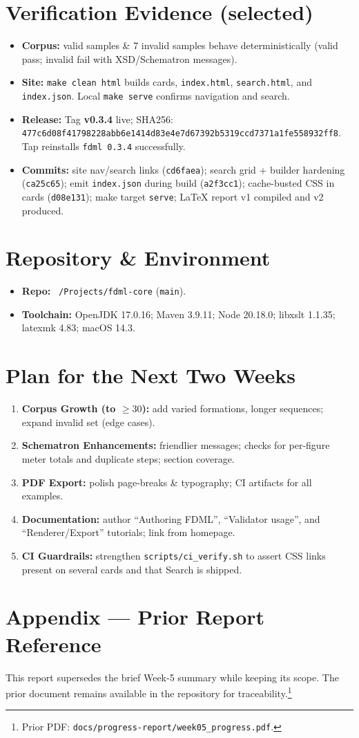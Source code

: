 \documentclass[11pt,a4paper]{article}
\newcommand{\code}[1]{\texttt{#1}}
\newcommand{\smallsec}[1]{\textbf{#1}\quad}
\begin{document}
\section{Verification Evidence (selected)}
\begin{itemize}[leftmargin=1.2em]
  \item \smallsec{Corpus:} 12 valid samples \& 7 invalid samples behave deterministically (valid pass; invalid fail with XSD/Schematron messages).
  \item \smallsec{Site:} \code{make clean html} builds cards, \code{index.html}, \code{search.html}, and \code{index.json}. Local \code{make serve} confirms navigation and search.
  \item \smallsec{Release:} Tag \textbf{v0.3.4} live; SHA256: \code{477c6d08f41798228abb6e1414d83e4e7d67392b5319ccd7371a1fe558932ff8}. Tap reinstalls \code{fdml 0.3.4} successfully.
  \item \smallsec{Commits:} site nav/search links (\code{cd6faea}); search grid + builder hardening (\code{ca25c65}); emit \code{index.json} during build (\code{a2f3cc1}); cache-busted CSS in cards (\code{d08e131}); make target \code{serve}; LaTeX report v1 compiled and v2 produced.
\end{itemize}

\section{Repository \& Environment}
\begin{itemize}[leftmargin=1.2em]
  \item \smallsec{Repo:} \code{\string~/Projects/fdml-core} (\code{main}).
  \item \smallsec{Toolchain:} OpenJDK 17.0.16; Maven 3.9.11; Node 20.18.0; libxslt 1.1.35; latexmk 4.83; macOS 14.3.
\end{itemize}

\section{Plan for the Next Two Weeks}
\begin{enumerate}[leftmargin=1.2em]
  \item \textbf{Corpus Growth (to $\ge 30$):} add varied formations, longer sequences; expand invalid set (edge cases).
  \item \textbf{Schematron Enhancements:} friendlier messages; checks for per-figure meter totals and duplicate steps; section coverage.
  \item \textbf{PDF Export:} polish page-breaks \& typography; CI artifacts for all examples.
  \item \textbf{Documentation:} author ``Authoring FDML'', ``Validator usage'', and ``Renderer/Export'' tutorials; link from homepage.
  \item \textbf{CI Guardrails:} strengthen \code{scripts/ci\_verify.sh} to assert CSS links present on several cards and that Search is shipped.
\end{enumerate}

\section{Appendix — Prior Report Reference}
This report supersedes the brief Week-5 summary while keeping its scope. The prior document remains available in the repository for traceability.\footnotesize\footnote{Prior PDF: \code{docs/progress-report/week05\_progress.pdf}.}
\normalsize
\end{document}
